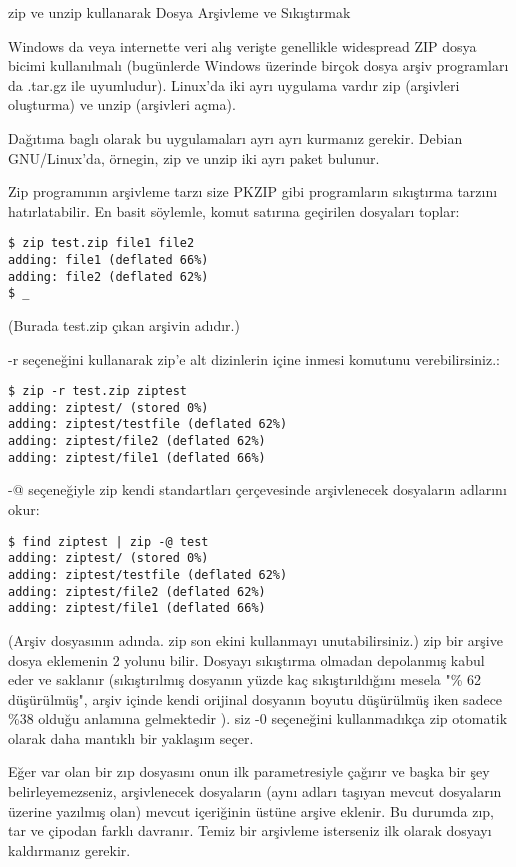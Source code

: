\documentclass[10pt,a5paper]{book}
\begin{document}
\begin{section}{zip ve unzip kullanarak Dosya Arşivleme ve Sıkıştırmak}

Windows da veya internette veri alış verişte genellikle widespread ZIP dosya bicimi kullanılmalı (bugünlerde Windows üzerinde birçok dosya arşiv programları da .tar.gz ile uyumludur). Linux'da iki ayrı uygulama vardır zip (arşivleri oluşturma) ve unzip (arşivleri açma).

Dağıtıma baglı olarak bu uygulamaları ayrı ayrı kurmanız gerekir.
Debian GNU/Linux'da, örnegin, zip ve unzip iki ayrı paket bulunur.

Zip programının arşivleme tarzı size PKZIP gibi programların sıkıştırma tarzını
hatırlatabilir. En basit söylemle, komut satırına geçirilen dosyaları toplar:
\begin{verbatim}
$ zip test.zip file1 file2
adding: file1 (deflated 66%)
adding: file2 (deflated 62%)
$ _
\end{verbatim}

(Burada test.zip çıkan arşivin adıdır.)

-r seçeneğini kullanarak zip'e alt dizinlerin içine inmesi komutunu verebilirsiniz.:
\begin{verbatim}
$ zip -r test.zip ziptest
adding: ziptest/ (stored 0%)
adding: ziptest/testfile (deflated 62%)
adding: ziptest/file2 (deflated 62%)
adding: ziptest/file1 (deflated 66%)
\end{verbatim}

-@ seçeneğiyle zip kendi standartları çerçevesinde arşivlenecek dosyaların adlarını okur:
\begin{verbatim}
$ find ziptest | zip -@ test
adding: ziptest/ (stored 0%)
adding: ziptest/testfile (deflated 62%)
adding: ziptest/file2 (deflated 62%)
adding: ziptest/file1 (deflated 66%)
\end{verbatim}

(Arşiv dosyasının adında. zip son ekini kullanmayı unutabilirsiniz.)
zip bir arşive dosya eklemenin 2 yolunu bilir. Dosyayı sıkıştırma olmadan depolanmış kabul eder ve saklanır (sıkıştırılmış dosyanın yüzde kaç sıkıştırıldığını mesela "\% 62 düşürülmüş", arşiv içinde kendi orijinal dosyanın boyutu düşürülmüş iken sadece \%38 olduğu anlamına gelmektedir ). siz -0 seçeneğini kullanmadıkça zip otomatik olarak daha mantıklı bir yaklaşım seçer.

Eğer var olan bir zıp dosyasını onun ilk parametresiyle çağırır ve başka bir şey belirleyemezseniz, arşivlenecek dosyaların (aynı adları taşıyan mevcut dosyaların üzerine yazılmış olan) mevcut içeriğinin üstüne arşive eklenir. Bu durumda zıp, tar ve çipodan farklı davranır. Temiz bir arşivleme isterseniz ilk olarak dosyayı kaldırmanız gerekir.


\end{section}
\end{document}
